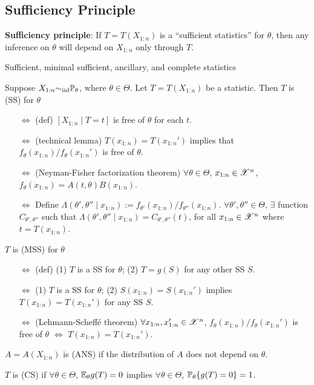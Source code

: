 \documentclass[10pt,a4paper]{book}
\begin{document}
\subsection{Sufficiency Principle}\label{sec:prin-data-reduce-suff}
\textbf{Sufficiency principle}: If $T=T(X_{1:n})$ is a ``sufficient statistics'' for $\theta$, then any inference on $\theta$ will depend on $X_{1:n}$ only through $T$.

\begin{defbox}{Sufficient, minimal sufficient, ancillary, and complete statistics}
	\begin{definition}\label{def:stat-SS-MSS-ANS-CS}
		Suppose $X_{1:n}{\sim}_{\mathrm{iid}} \mathbb P_{\theta}$, where $\theta\in\Theta$. Let $T=T(X_{1:n})$ be a statistic. Then $T$ is  (SS) for $\theta$
		\begin{itemize}
			\item[$\Leftrightarrow$] (def) $[X_{1:n}\mid T=t]$ is free of $\theta$ for each $t$.
			\item[$\Leftrightarrow$] (technical lemma) $T(x_{1:n})=T(x_{1:n}')$ implies that $f_{\theta}(x_{1:n})/f_{\theta}(x_{1:n}')$ is free of $\theta$.
			\item[$\Leftrightarrow$] (Neyman-Fisher factorization theorem) $\forall\theta\in\Theta$, $x_{1:n}\in\mathscr{X}^n$, $f_\theta(x_{1:n})=A(t,\theta)B(x_{1:n})$.
		\item[$\Leftrightarrow$] Define $\Lambda(\theta',\theta''\mid x_{1:n}):=f_{\theta'}(x_{1:n})/f_{\theta''}(x_{1:n})$. $\forall \theta',\theta''\in\Theta$, $\exists$ function $C_{\theta',\theta''}$ such that $\Lambda(\theta',\theta''\mid x_{1:n})=C_{\theta',\theta''}(t)$, for all $x_{1:n}\in\mathscr{X}^n$ where $t=T(x_{1:n})$.    
		\end{itemize}
	$T$ is  (MSS) for $\theta$
	\begin{itemize}
		\item[$\Leftrightarrow$] (def) (1) $T$ is a SS for $\theta$; (2) $T=g(S)$ for any other SS $S$.
		\item[$\Leftrightarrow$] (1) $T$ is a SS for $\theta$; (2) $S(x_{1:n})=S(x_{1:n}')$ implies $T(x_{1:n})=T(x_{1:n}')$ for any SS $S$.   
		\item[$\Leftrightarrow$] (Lehmann-Scheffé theorem) $\forall x_{1:n},x_{1:n}'\in\mathscr{X}^n$, $f_{\theta}(x_{1:n})/f_{\theta}(x_{1:n}')$ is free of $\theta$ $\Leftrightarrow$ $T(x_{1:n})=T(x_{1:n}')$.    
	\end{itemize}
	$A=A(X_{1:n})$ is  (ANS) if the distribution of $A$ does not depend on $\theta$. 

	\noindent $T$ is  (CS) if $\forall\theta\in\Theta$, $\mathbb E_{\theta}g(T)=0$ implies $\forall\theta\in\Theta$, $\mathbb P_{\theta}\{g(T)=0\}=1$. 
	\end{definition}
\end{defbox}
\end{document}
